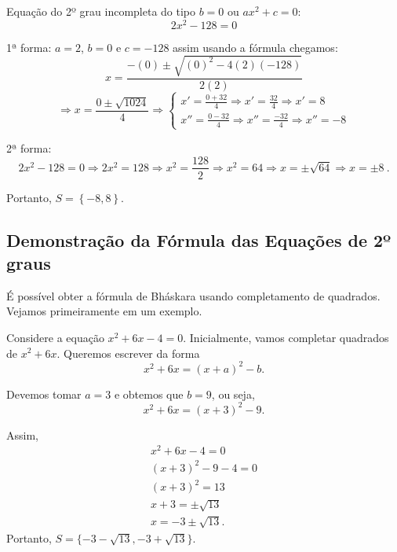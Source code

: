  \begin{exem}
  Equação do 2º grau incompleta do tipo $b=0$ ou $ax^2 + c = 0$:
\begin{equation*}
2x^2 - 128 = 0
\end{equation*}

  1ª forma:  $a = 2$, $b = 0$ e $c = -128$ assim usando a fórmula chegamos:
\begin{equation*}
x = \frac{- (0) \pm \sqrt{(0)^2 - 4 (2)(-128)}}{2 (2)}
\end{equation*}
  \[\Rightarrow x = \frac{0 \pm \sqrt{1024}}{4} \Rightarrow \begin{cases}
                                                          x' = \frac{ 0 + 32}{4} \Rightarrow x' = \frac{32}{4} \Rightarrow x' = 8 \\
                                                          x'' = \frac{0 - 32}{4} \Rightarrow x''= \frac{-32}{4} \Rightarrow x''= -8
                                                         \end{cases}\]


  2ª forma:
\begin{equation*}
2x^2 - 128 = 0 \Rightarrow 2x^2 = 128 \Rightarrow x^2 = \frac{128}{2} \Rightarrow x^2 = 64 \Rightarrow x = \pm \sqrt{64} \Rightarrow x = \pm 8 \ .
\end{equation*}
  
  Portanto, $S= \left\{ -8, 8 \right\}$.
\end{exem}

\subsection{Demonstração da Fórmula das Equações de 2º graus}

É possível obter a fórmula de Bháskara usando completamento de quadrados. Vejamos primeiramente em um exemplo.

\begin{exem}
    Considere a equação $x^2+6x-4=0$. Inicialmente, vamos completar quadrados de $x^2+6x$. Queremos escrever da forma
    \begin{equation*}
        x^2+6x = (x+a)^2-b.
    \end{equation*}

    Devemos tomar $a=3$ e obtemos que $b=9$, ou seja, 
    \begin{equation*}
        x^2+6x = (x+3)^2-9.
    \end{equation*}

    Assim,
    \begin{eqnarray*}
        x^2+6x-4=0\\
        (x+3)^2-9-4=0\\
        (x+3)^2=13\\
        x+3=\pm \sqrt{13}\\
        x = -3 \pm \sqrt{13}.
    \end{eqnarray*}
    Portanto, $S=\{-3-\sqrt{13},-3+\sqrt{13}\}$.
\end{exem}

